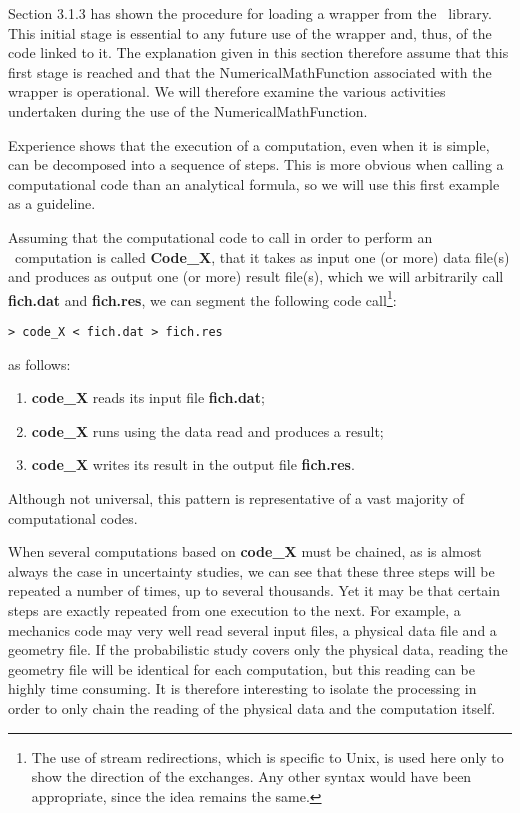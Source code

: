 Section 3.1.3 has shown the procedure for loading a wrapper from the \OT\ library. This initial stage is essential to any future use of the wrapper and, thus, of the code linked to it. The explanation given in this section therefore assume that this first stage is reached and that the NumericalMathFunction associated with the wrapper is operational. We will therefore examine the various activities undertaken during the use of the NumericalMathFunction.

Experience shows that the execution of a computation, even when it is simple, can be decomposed into a sequence of steps. This is more obvious when calling a computational code than an analytical formula, so we will use this first example as a guideline.

Assuming that the computational code to call in order to perform an \OT\ computation is called {\bf Code\_X}, that it takes as input one (or more) data file(s) and produces as output one (or more) result file(s), which we will arbitrarily call {\bf fich.dat} and {\bf fich.res}, we can segment the following code call\footnote{The use of stream redirections, which is specific to Unix, is used here only to show the direction of the exchanges. Any other syntax would have been appropriate, since the idea remains the same.}:

\lstset{language=Bash, basicstyle=\normalsize}
\begin{lstlisting}[frame=TBRL]
> code_X < fich.dat > fich.res
\end{lstlisting}

as follows:
\begin{enumerate}
\item {\bf code\_X} reads its input file {\bf fich.dat};
\item {\bf code\_X} runs using the data read and produces a result;
\item {\bf code\_X} writes its result in the output file {\bf fich.res}.
\end{enumerate}

Although not universal, this pattern is representative of a vast majority of computational codes.

When several computations based on {\bf code\_X} must be chained, as is almost always the case in uncertainty studies, we can see that these three steps will be repeated a number of times, up to several thousands. Yet it may be that certain steps are exactly repeated from one execution to the next. For example, a mechanics code may very well read several input files, a physical data file and a geometry file. If the probabilistic study covers only the physical data, reading the geometry file will be identical for each computation, but this reading can be highly time consuming. It is therefore interesting to isolate the processing in order to only chain the reading of the physical data and the computation itself.

